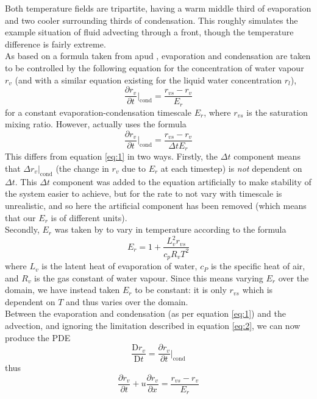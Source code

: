\documentclass[11pt]{article}
\begin{document}
Both temperature fields are tripartite, having a warm middle third of evaporation and two cooler surrounding thirds of condensation. This roughly simulates the example situation of fluid advecting through a front, though the temperature difference is fairly extreme. \\
As based on a formula taken from \citet[p.~2920]{BF2002} apud \citet{RH1983}, evaporation and condensation are taken to be controlled by the following equation for the concentration of water vapour $r_v$ (and with a similar equation existing for the liquid water concentration $r_l$),
\begin{equation} \label{eq:1}
\frac{\partial r_v}{\partial t}|_{\text{cond}}=\frac{r_{vs} - r_v}{E_r}
\end{equation}
for a constant evaporation-condensation timescale $E_r$, where $r_{vs}$ is the saturation mixing ratio. However, \citeauthor{BF2002} actually uses the formula
\begin{equation}
\frac{\partial r_v}{\partial t}|_{\text{cond}}=\frac{r_{vs} - r_v}{\Delta t E_r}	\label{eq:artificial}
\end{equation}
This differs from equation \ref{eq:1} in two ways. Firstly, the $\Delta t$ component means that $\Delta r_v|_{\text{cond}}$ (the change in $r_v$ due to $E_r$ at each timestep) is \emph{not} dependent on $\Delta t$. This $\Delta t$ component was added to the equation artificially to make stability of the system easier to achieve, but for the rate to not vary with timescale is unrealistic, and so here the artificial component has been removed (which means that our $E_r$ is of different units). \\
Secondly, $E_r$ was taken by \citeauthor{BF2002} to vary in temperature according to the formula
\begin{equation}
E_r = 1+\frac{L_v^2r_{vs}}{c_pR_vT^2} \label{eq:condrate}
\end{equation}
where $L_v$ is the latent heat of evaporation of water, $c_P$ is the specific heat of air, and $R_v$ is the gas constant of water vapour. Since this means varying $E_r$ over the domain, we have instead taken $E_r$ to be constant: it is only $r_{vs}$ which is dependent on $T$ and thus varies over the domain. \\
Between the evaporation and condensation (as per equation \ref{eq:1}) and the advection, and ignoring the limitation described in equation \ref{eq:2}, we can now produce the PDE
\[
\frac{\text{D} r_v}{\text{D} t}=\frac{\partial r_v}{\partial t}|_{\text{cond}}
\]
thus
\begin{equation}
\frac{\partial r_v}{\partial t}+u\frac{\partial r_v}{\partial x}=\frac{r_{vs} - r_v}{E_r} \label{eq:3}
\end{equation}
\end{document}
